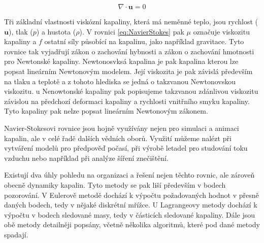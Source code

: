 \begin{equation}
	\nabla \cdot \mathbf{u} = 0
	\label{eq:NavierStokes2}
\end{equation}

Tři základní vlastnosti viskózní kapaliny, která má neměnné teplo, jsou rychlost ($\mathbf{u}$), tlak ($p$) a hustota ($\rho$). V rovnici \ref{eq:NavierStokes} pak $\mu$ označuje viskozitu kapaliny a $f$ ostatní síly působící na kapalinu, jako například gravitace. Tyto rovnice tak vyjadřují zákon o zachování hybnosti a zákon o zachování hmotnosti pro Newtonské kapaliny. Newtonosvksá kapalina je pak kapalina kterou lze popsat lineárním Newtonovým modelem. Její viskozita je pak závislá především na tlaku a teplotě a z tohoto hlediska se jedná o takzvanou Newtonovskou viskozitu. u Nenowtonské kapaliny pak popisujeme takzvanou zdánlivou viskozitu závislou na předchozí deformaci kapaliny a rychlosti vnitřního smyku kapaliny. Tyto kapaliny pak nelze popsat lineárním Newtonovým zákonem.\cite{StejskalJan2013Pmks}

Navier-Stokesovi rovnice jsou hojně využívány nejen pro simulaci a animaci kapalin, ale v celé řadě dalších vědních oborů. Využití můžeme nalézt při vytváření modelů pro předpověď počasí, při výrobě letadel pro studování toku vzduchu nebo například při analýze šíření znečištění.
\break

Existují dva úhly pohledu na organizaci a řešení nejen těchto rovnic, ale zároveň obecně dynamiky kapalin. Tyto metody se pak liší především v bodech pozorování. V Eulerově metodě dochází k výpočtu požadovaných hodnot v přesně daných bodech, tedy v nějaké diskrétní mřížce. U Lagrangeovy metody dochází k výpočtu v bodech sledované masy, tedy v částicích sledované kapaliny. Dále jsou obě metody detailněji popsány, včetně několika algoritmů, které pod dané metody spadají.

